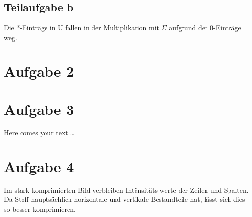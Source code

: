 \documentclass[10pt,a4paper]{article}
\begin{document}
\subsection{Teilaufgabe b}
    Die *-Einträge in U fallen in der Multiplikation mit $\Sigma$ aufgrund der 0-Einträge weg.

\section*{Aufgabe 2}


\section*{Aufgabe 3}
Here comes your text \ldots

\section*{Aufgabe 4}

Im stark komprimierten Bild verbleiben Intänsitäts werte der Zeilen und Spalten.
Da \glqq Stoff\grqq{} hauptsächlich horizontale und vertikale Bestandteile hat, lässt sich dies so besser komprimieren.
\end{document}
